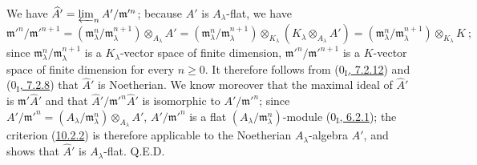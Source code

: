 We have $\widehat A'=\varprojlim_n A'/\mathfrak m'^{n}$; because
$A'$ is $A_\lambda$-flat, we have
\[
  \mathfrak m'^{n}/\mathfrak m'^{n+1}
  =(\mathfrak m_\lambda^n/\mathfrak m_\lambda^{n+1})
    \otimes_{A_\lambda}A'
  =(\mathfrak m_\lambda^n/\mathfrak m_\lambda^{n+1})
    \otimes_{K_\lambda}(K_\lambda\otimes_{A_\lambda}A')
  =(\mathfrak m_\lambda^n/\mathfrak m_\lambda^{n+1})
    \otimes_{K_\lambda}K~;
\]
since $\mathfrak m_\lambda^n/\mathfrak m_\lambda^{n+1}$ is a
$K_\lambda$-vector space of finite dimension,
$\mathfrak m'^{n}/\mathfrak m'^{n+1}$ is a $K$-vector space of finite
dimension for every $n\geq0$. It therefore follows from
(\hyperref[0.7.2.12]{$0_{\mathrm I}$, 7.2.12}) and
(\hyperref[0.7.2.8]{$0_{\mathrm I}$, 7.2.8}) that $\widehat A'$ is
Noetherian. We know moreover that the maximal ideal of $\widehat A'$ is
$\mathfrak m'\widehat A'$ and that
$\widehat A'/\mathfrak m'^{n}\widehat A'$ is isomorphic to
$A'/\mathfrak m'^{n}$; since
$A'/\mathfrak m'^{n}=(A_\lambda/\mathfrak m_\lambda^n)
\otimes_{A_\lambda}A'$, $A'/\mathfrak m'^{n}$ is a flat
$(A_\lambda/\mathfrak m_\lambda^n)$-module
(\hyperref[0.6.2.1]{$0_{\mathrm I}$, 6.2.1}); the criterion
(\hyperref[0.10.2.2]{10.2.2}) is therefore applicable to the Noetherian
$A_\lambda$-algebra $\widehat A'$, and shows that $\widehat A'$
is $A_\lambda$-flat. Q.E.D.


